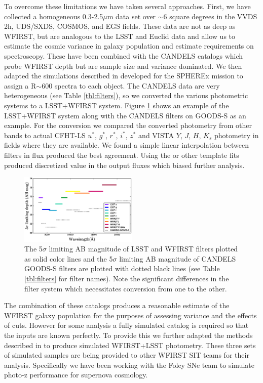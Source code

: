 To overcome these limitations we have taken several approaches.  First, we have collected a homogeneous 0.3-2.5$\mu$m data set over $\sim6$ square degrees in the VVDS 2h, UDS/SXDS, COSMOS, and EGS fields.  These data are not as deep as WFIRST, but are analogous to the LSST and Euclid data and allow us to estimate the cosmic variance in galaxy population and estimate requirements on spectroscopy.  These have been combined with the CANDELS catalogs which probe WFIRST depth but are sample size and variance dominated.  We then adapted the simulations described in \citet{stickley2016} developed for the SPHEREx mission to assign a R$\sim$600 spectra to each object.  The CANDELS data are very heterogeneous (see Table \ref{tbl:filters}), so we converted the various photometric systems to a LSST+WFIRST system.  Figure \ref{fig:filters} shows an example of the LSST+WFIRST system along with the CANDELS filters on GOODS-S as an example.  For the conversion we compared the converted photometry from other bands to actual CFHT-LS $u^*$, $g^*$, $r^*$, $i^*$, $z^*$ and VISTA $Y$, $J$, $H$, $K_s$ photometry in fields where they are available.   We found a simple linear interpolation between filters in flux produced the best agreement.  Using the \citet{stickley2016} or other template fits produced discretized value  in the output fluxes which biased further analysis.  




\begin{figure} 
\centering
  \includegraphics[trim=0cm 0cm 0cm 0cm, clip,width=0.50\textwidth] {./plots/filters.eps}
\caption{The 5$\sigma$ limiting AB magnitude of LSST and WFIRST filters plotted as solid color lines and the 5$\sigma$ limiting AB magnitude of CANDELS GOODS-S filters are plotted with dotted black lines (see Table \ref{tbl:filters} for filter names).  Note the significant differences in the filter system which necessitates conversion from one to the other. }
\label{fig:filters}
\end{figure}


The combination of these catalogs produces a reasonable estimate of the WFIRST galaxy population for the purposes of assessing variance and the effects of cuts.  However for some analysis a fully simulated catalog is required so that the inputs are known perfectly.  To provide this we further adapted the methods described in \citet{stickley2016} to produce simulated WFIRST+LSST photometry.  These three sets of simulated samples are being provided to other WFIRST SIT teams for their analysis. Specifically we have been working with the Foley SNe team to simulate photo-z performance for supernova cosmology. 

